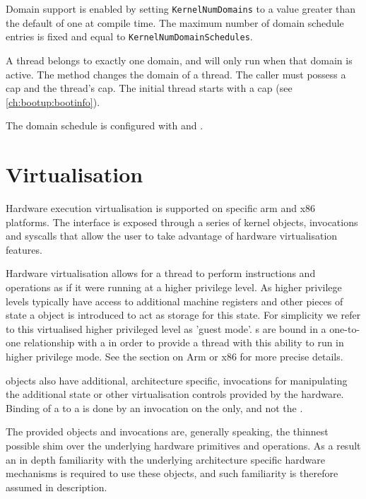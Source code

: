 Domain support is enabled by setting \texttt{KernelNumDomains} to a value greater than the
default of one at compile time. The maximum number of domain schedule entries is fixed and
equal to \texttt{KernelNumDomainSchedules}.

A thread belongs to exactly one domain, and will only run when that domain
is active.
The  method changes the domain
of a thread.
The caller must possess a  cap and the thread's  cap.
The initial thread starts with a  cap (see
\autoref{ch:bootup:bootinfo}).

The domain schedule is configured with
 and
.

\section{Virtualisation}
\label{sec:virt}

Hardware execution virtualisation is supported on specific arm and x86 platforms. The interface is exposed through a series
of kernel objects, invocations and syscalls that allow the user to take advantage of hardware
virtualisation features.

Hardware virtualisation allows for a thread to perform instructions and operations as if it were
running at a higher privilege level. As higher privilege levels typically have access to
additional machine registers and other pieces of state a  object is introduced to act
as storage for this state. For simplicity we refer to this virtualised higher privileged level as
'guest mode'. s are bound in a one-to-one relationship with a  in order
to provide a thread with this ability to run in higher privilege mode. See the section on
Arm or x86 for more precise details.

 objects also have additional, architecture specific, invocations for manipulating
the additional state or other virtualisation controls provided by the hardware. Binding of
a  to a  is done by an invocation on the  only, and not the .

The provided objects and invocations are, generally speaking, the thinnest possible shim over
the underlying hardware primitives and operations. As a result an in depth familiarity with
the underlying architecture specific hardware mechanisms is required to use these objects, and
such familiarity is therefore assumed in description.

